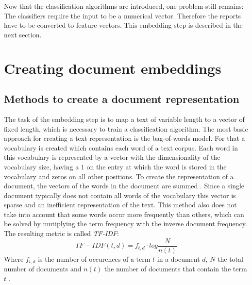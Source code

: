 Now that the classification algorithms are introduced, one problem still remains:
The classifiers require the input to be a numerical vector.
Therefore the reports have to be converted to feature vectors.
This embedding step is described in the next section.


\section{Creating document embeddings}
\label{sec:creating_document_embeddings}
\subsection{Methods to create a document representation}
\label{subsec:methods_for_document_representation}
The task of the embedding step is to map a text of variable length to a vector of fixed length, which is necessary to train a classification algorithm.
The most basic approach for creating a text representation is the bag-of-words model.
For that a vocabulary is created which contains each word of a text corpus.
Each word in this vocabulary is represented by a vector with the dimensionality of the vocabulary size, having a $1$ on the entry at which the word is stored in the vocabulary and zeros on all other positions.
To create the representation of a document, the vectors of the words in the document are summed \cite[p. 13]{Grzegorczyk2018}.
Since a single document typically does not contain all words of the vocabulary this vector is sparse and an inefficient representation of the text.
This method also does not take into account that some words occur more frequently than others, which can be solved by mutiplying the term frequency with the inverse document frequency.
The resulting metric is called \textit{TF-IDF}:
\begin{equation}
    TF-IDF(t,d) = f_{t,d} \cdot log \frac{N}{n(t)}
    \label{equation:tf_idf}
\end{equation}
Where $f_{t,d}$ is the number of occurences of a term $t$ in a document $d$, $N$ the total number of documents and $n(t)$ the number of documents that contain the term $t$ \cite[p. 13]{Grzegorczyk2018}.

